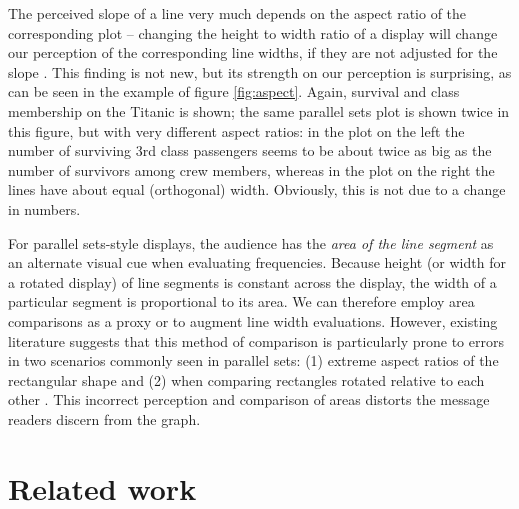 \documentclass[journal]{vgtc}\usepackage{graphicx, color}
\begin{document}
The perceived slope of a line very much depends on the aspect ratio of the corresponding plot -- changing the height to width ratio of a display  will change our perception of the corresponding line widths, if they are not adjusted for the slope \citep{cleveland:1984}. This finding is not new, but its strength on our perception is surprising, as can be seen in the example of  figure \ref{fig:aspect}.  Again, survival and class membership on the Titanic is shown; the same parallel sets plot is shown twice in this figure, but with very different aspect ratios: in the  plot on the left the number of surviving 3rd class passengers seems to be about twice as big as the number of survivors among crew members, whereas in the plot on the right the lines have about equal (orthogonal) width. Obviously, this is not due to a change in numbers.

For parallel sets-style displays, the audience has the {\it area of the line segment} as an alternate visual cue when evaluating frequencies. Because height (or width for a rotated display) of  line segments is constant across the display, the width of a particular  segment is proportional to its area. We can therefore employ area comparisons as a proxy or to augment line width evaluations. 
However, existing literature suggests that this method of comparison is particularly  prone to errors in two scenarios commonly seen in parallel sets: (1) extreme aspect ratios of the rectangular shape \citep{heer:2010} %
and (2) when comparing rectangles rotated relative to each other \citep{kong:2010}. 
This incorrect perception and comparison of areas distorts the message readers discern from the graph. %


\section{Related work}
\end{document}
